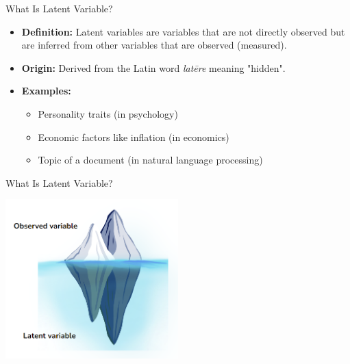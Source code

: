 \documentclass[serif, aspectratio=169]{beamer}
\begin{document}
\begin{frame}{What Is Latent Variable?}
    \begin{itemize}
        \item \textbf{Definition:} Latent variables are variables that are not directly observed but are inferred from other variables that are observed (measured).
    \end{itemize}
    
    \vspace{0.5cm} %
    
    \begin{itemize}
        \item \textbf{Origin:} Derived from the Latin word \textit{latēre} meaning "hidden".
    \end{itemize}

    \vspace{0.5cm} %
    
    \begin{itemize}
        \item \textbf{Examples:}
        \begin{itemize}
            \item Personality traits (in psychology)
            \item Economic factors like inflation (in economics)
            \item Topic of a document (in natural language processing)
        \end{itemize}
    \end{itemize}

\end{frame}

\begin{frame}{What Is Latent Variable?}
      \begin{center}
        \includegraphics[width=0.5\textwidth]{pic/what is latent variable.png} 
    \end{center}
\end{frame}
\end{document}
